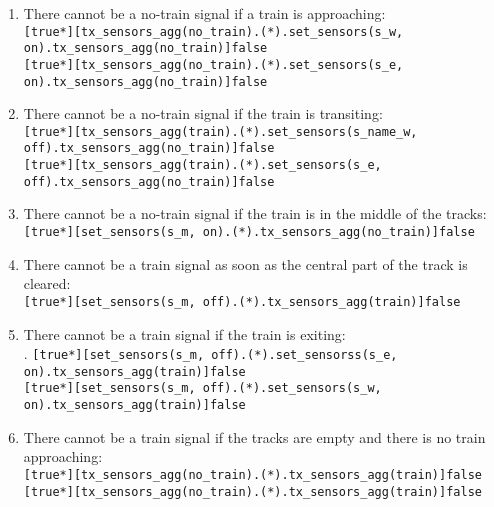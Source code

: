 \documentclass[final]{report}
\begin{document}
\begin{enumerate}
\item There cannot be a no-train signal if a train is approaching:\\
    \texttt{[true*][tx\_sensors\_agg(no\_train).(*).set\_sensors(s\_w, on).tx\_sensors\_agg(no\_train)]false}\\
    \texttt{[true*][tx\_sensors\_agg(no\_train).(*).set\_sensors(s\_e, on).tx\_sensors\_agg(no\_train)]false} 

\item There cannot be a no-train signal if the train is transiting:\\
    \texttt{[true*][tx\_sensors\_agg(train).(*).set\_sensors(s\_name\_w, off).tx\_sensors\_agg(no\_train)]false}\\
    \texttt{[true*][tx\_sensors\_agg(train).(*).set\_sensors(s\_e, off).tx\_sensors\_agg(no\_train)]false}


\item There cannot be a no-train signal if the train is in the middle of the tracks:\\
    \texttt{[true*][set\_sensors(s\_m, on).(*).tx\_sensors\_agg(no\_train)]false}

\item There cannot be a train signal as soon as the central part of the track is cleared:\\
    \texttt{[true*][set\_sensors(s\_m, off).(*).tx\_sensors\_agg(train)]false}

\item There cannot be a train signal if the train is exiting:\\.
    \texttt{[true*][set\_sensors(s\_m, off).(*).set\_sensorss(s\_e, on).tx\_sensors\_agg(train)]false}\\
    \texttt{[true*][set\_sensors(s\_m, off).(*).set\_sensors(s\_w, on).tx\_sensors\_agg(train)]false}


\item There cannot be a train signal if the tracks are empty and there is no train approaching:\\
    \texttt{[true*][tx\_sensors\_agg(no\_train).(*).tx\_sensors\_agg(train)]false}\\
    \texttt{[true*][tx\_sensors\_agg(no\_train).(*).tx\_sensors\_agg(train)]false}
\end{enumerate}
\end{document}
